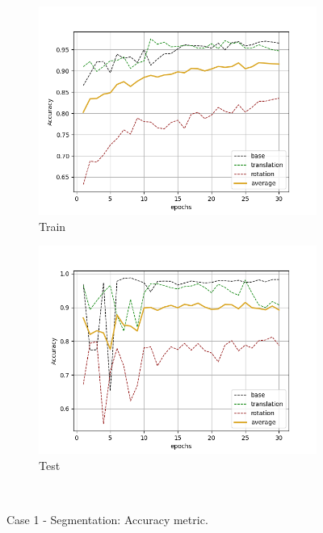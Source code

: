 \begin{figure}[H]
    \begin{subfigure}{.48\linewidth}
    \centering
    \includegraphics[scale=0.45]{Img/seg_nonoise_train_acc.png}
    \caption{Train}
    \end{subfigure}
    \begin{subfigure}{.48\linewidth}
    \centering
    \includegraphics[scale=0.45]{Img/seg_nonoise_test_acc.png}
    \caption{Test}
    \end{subfigure}\\
    \caption{Case 1 - Segmentation: Accuracy metric.}
\end{figure}
